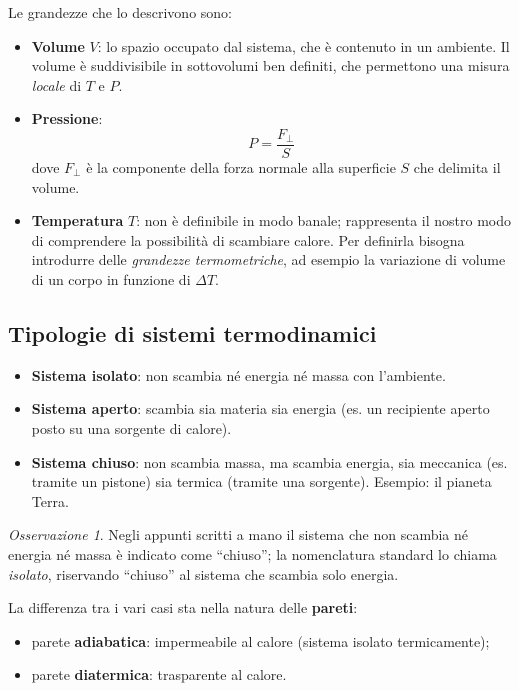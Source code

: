 \documentclass[11pt, a4paper, openright]{book}
\theoremstyle{plain}
\theoremstyle{definition}
\theoremstyle{remark}
\newtheorem{osservazione}[teorema]{Osservazione}
\begin{document}
Le grandezze che lo descrivono sono:
\begin{itemize}
    \item \textbf{Volume} $V$: lo spazio occupato dal sistema, che è contenuto in un ambiente. Il volume è suddivisibile in sottovolumi ben definiti, che permettono una misura \emph{locale} di $T$ e $P$.
    \item \textbf{Pressione}:
    \begin{equation}
        P = \frac{F_\perp}{S}
    \end{equation}
    dove $F_\perp$ è la componente della forza normale alla superficie $S$ che delimita il volume.
    \item \textbf{Temperatura} $T$: non è definibile in modo banale; rappresenta il nostro modo di comprendere la possibilità di scambiare calore. Per definirla bisogna introdurre delle \emph{grandezze termometriche}, ad esempio la variazione di volume di un corpo in funzione di $\Delta T$.
\end{itemize}

\subsection{Tipologie di sistemi termodinamici}
\begin{itemize}
    \item \textbf{Sistema isolato}: non scambia né energia né massa con l'ambiente.
    \item \textbf{Sistema aperto}: scambia sia materia sia energia (es. un recipiente aperto posto su una sorgente di calore).
    \item \textbf{Sistema chiuso}: non scambia massa, ma scambia energia, sia meccanica (es. tramite un pistone) sia termica (tramite una sorgente). Esempio: il pianeta Terra.
\end{itemize}

\begin{osservazione}
    Negli appunti scritti a mano il sistema che non scambia né energia né massa è indicato come ``chiuso''; la nomenclatura standard lo chiama \emph{isolato}, riservando ``chiuso'' al sistema che scambia solo energia.
\end{osservazione}

La differenza tra i vari casi sta nella natura delle \textbf{pareti}:
\begin{itemize}
    \item parete \textbf{adiabatica}: impermeabile al calore (sistema isolato termicamente);
    \item parete \textbf{diatermica}: trasparente al calore.
\end{itemize}
\end{document}
